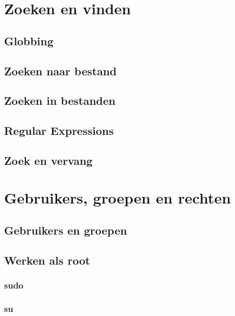\documentclass[a4paper,12pt,twoside,openright,titlepage]{book}
\begin{document}
\chapter{Zoeken en vinden}\label{zoekenenvinden}

\section{Globbing}

\section{Zoeken naar bestand}


\section{Zoeken in bestanden}


\section{Regular Expressions}

\section{Zoek en vervang}


\chapter{Gebruikers, groepen en rechten}

\section{Gebruikers en groepen}



\section{Werken als root}

\subsection{sudo}

\subsection{su}

\end{document}
